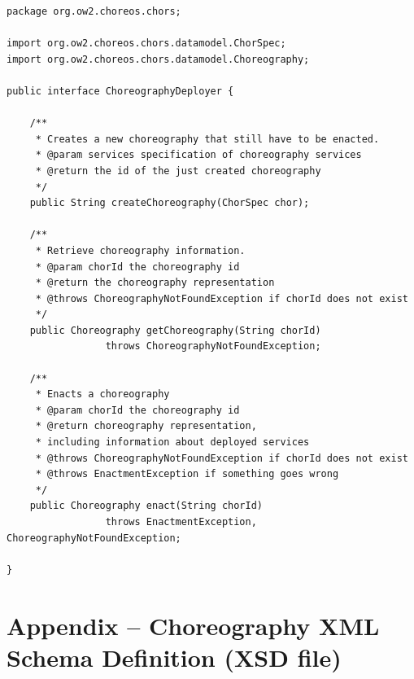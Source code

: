 \documentclass[a4paper, 10pt]{article}
\newcommand{\ee}{CHOReOS Enactment Engine}
\begin{document}
\lstset{language=Java}
\begin{lstlisting}[caption=\ee\ Java interface, label=lst:java_interface]
package org.ow2.choreos.chors;

import org.ow2.choreos.chors.datamodel.ChorSpec;
import org.ow2.choreos.chors.datamodel.Choreography;

public interface ChoreographyDeployer {
	
	/**
	 * Creates a new choreography that still have to be enacted.
	 * @param services specification of choreography services
	 * @return the id of the just created choreography
	 */
	public String createChoreography(ChorSpec chor);
	
	/**
	 * Retrieve choreography information.
	 * @param chorId the choreography id
	 * @return the choreography representation
	 * @throws ChoreographyNotFoundException if chorId does not exist 
	 */
	public Choreography getChoreography(String chorId) 
	             throws ChoreographyNotFoundException;

	/**
	 * Enacts a choreography
	 * @param chorId the choreography id
	 * @return choreography representation, 
	 * including information about deployed services 
	 * @throws ChoreographyNotFoundException if chorId does not exist 
	 * @throws EnactmentException if something goes wrong 
	 */
	public Choreography enact(String chorId) 
	             throws EnactmentException, ChoreographyNotFoundException;
	
}
\end{lstlisting}

\section*{Appendix -- Choreography XML Schema Definition (XSD file)}
\end{document}
